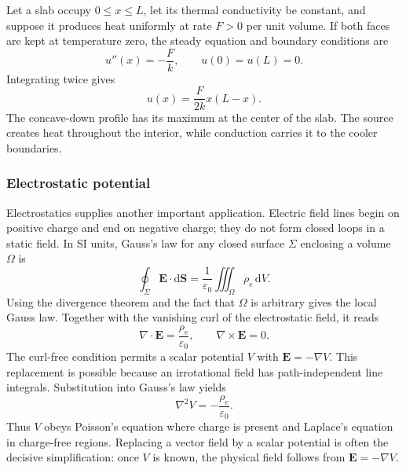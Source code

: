 \begin{example}
Let a slab occupy $0\leq x\leq L$, let its thermal conductivity be constant, and suppose it produces heat uniformly at rate $F>0$ per unit volume. If both faces are kept at temperature zero, the steady equation and boundary conditions are
\begin{equation}
u''(x)=-\frac{F}{k},
\qquad u(0)=u(L)=0.
\end{equation}
Integrating twice gives
\begin{equation}
u(x)=\frac{F}{2k}x(L-x).
\end{equation}
The concave-down profile has its maximum at the center of the slab. The source creates heat throughout the interior, while conduction carries it to the cooler boundaries.
\end{example}

\subsubsection{Electrostatic potential}

Electrostatics supplies another important application. Electric field lines begin on positive charge and end on negative charge; they do not form closed loops in a static field. In SI units, Gauss's law for any closed surface $\Sigma$ enclosing a volume $\Omega$ is
\begin{equation}
\oint_\Sigma\mathbf{E}\cdot\mathrm{d}\mathbf{S}
=\frac{1}{\varepsilon_0}\iiint_\Omega\rho_e\,\mathrm{d}V.
\end{equation}
Using the divergence theorem and the fact that $\Omega$ is arbitrary gives the local Gauss law. Together with the vanishing curl of the electrostatic field, it reads
\begin{equation}
\nabla\cdot\mathbf{E}=\frac{\rho_e}{\varepsilon_0},
\qquad \nabla\times\mathbf{E}=0.
\end{equation}
The curl-free condition permits a scalar potential $V$ with $\mathbf{E}=-\nabla V$. This replacement is possible because an irrotational field has path-independent line integrals. Substitution into Gauss's law yields
\begin{equation}
\nabla^2V=-\frac{\rho_e}{\varepsilon_0}.
\end{equation}
Thus $V$ obeys Poisson's equation where charge is present and Laplace's equation in charge-free regions. Replacing a vector field by a scalar potential is often the decisive simplification: once $V$ is known, the physical field follows from $\mathbf{E}=-\nabla V$.

